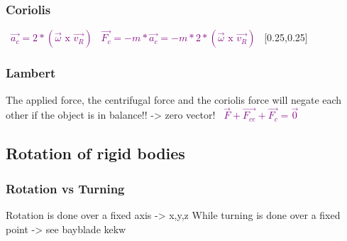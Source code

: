 \documentclass[main.tex,fontsize=8pt,paper=a4,paper=portrait,DIV=calc,]{scrartcl}
\begin{document}
\begin{multicols*}{2}
\subsubsection{Coriolis}
\, \newline
\large \textcolor{purple}{\( \vec{a_c} = 2* (\vec{\omega} \text{ x } \vec{v_R}) \)}\newline
\, \newline
\large \textcolor{purple}{\( \vec{F_c} = -m * \vec{a_c} = -m * 2 * (\vec{\omega} \text{ x } \vec{v_R} ) \)}
\, \newline
\normalsize 
{}[0.25,0.25]

\subsubsection{Lambert}
The applied force, the centrifugal force and the coriolis force will negate each other if the object is in balance!! -> zero vector!
\, \newline
\large \textcolor{purple}{\( \vec{F} + \vec{F_{ce}} + \vec{F_c} = \vec{0} \)}\newline
\, \newline
\normalsize

\subsection{Rotation of rigid bodies}

\subsubsection{Rotation vs Turning}
Rotation is done over a fixed axis -> x,y,z \newline
While turning is done over a fixed point -> see bayblade kekw


\end{multicols*}
\end{document}
